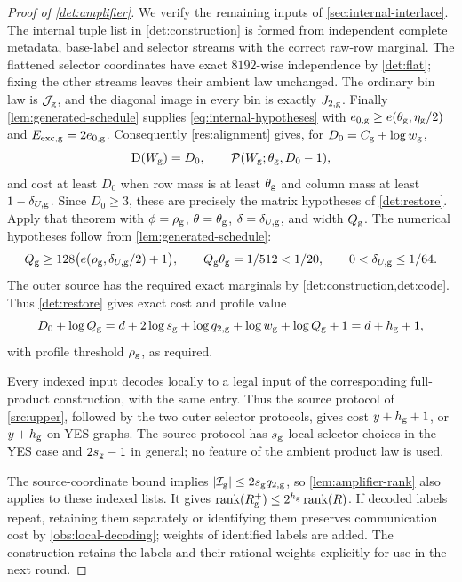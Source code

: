 \documentclass[11pt]{article} \usepackage[utf8]{inputenc}
\theoremstyle{plain} \newtheorem{theorem}{Theorem}[section]
\theoremstyle{definition} \newaliascnt{definition}{theorem}
\newcommand{\D}{\operatorname{D}}
\newcommand{\RP}[3]{\mathcal{P}(#1;#2,#3)}
\DeclareMathOperator{\rank}{rank} \crefname{claim}{Claim}{Claims}
\begin{document}
\begin{proof}[Proof of \cref{det:amplifier}]
We verify the remaining inputs of \cref{sec:internal-interlace}.
The internal tuple list in \cref{det:construction} is formed from independent
complete metadata, base-label and selector streams with the correct raw-row
marginal. The flattened selector coordinates have exact $8192$-wise
independence by \cref{det:flat}; fixing the other streams leaves their
ambient law unchanged. The ordinary bin law is $\mathcal J_{\rm g}$, and
the diagonal image in every bin is exactly $J_{2,\rm g}$. Finally
\cref{lem:generated-schedule} supplies \eqref{eq:internal-hypotheses} with
$e_{0,\rm g}\ge e(\theta_{\rm g},\eta_{\rm g}/2)$ and
$E_{\rm exc,g}=2e_{0,\rm g}$.
Consequently \cref{res:alignment} gives, for
$D_0=C_{\rm g}+\log w_{\rm g}$,
\[
 \D(W_{\rm g})=D_0,\qquad \RP{W_{\rm g}}{\theta_{\rm g}}{D_0-1},
\]
and cost at least $D_0$ when row mass is at least $\theta_{\rm g}$ and
column mass at least $1-\delta_{U,\rm g}$. Since $D_0\ge3$, these are
precisely the matrix hypotheses of \cref{det:restore}.
Apply that theorem with \(\phi=\rho_{\rm g}\), \(\theta=\theta_{\rm g}\),
\(\delta=\delta_{U,\rm g}\), and width \(Q_{\rm g}\). The numerical hypotheses
follow from \cref{lem:generated-schedule}:
\[
Q_{\rm g}\ge128\bigl(e(\rho_{\rm g},\delta_{U,\rm g}/2)+1\bigr),\qquad Q_{\rm
g}\theta_{\rm g}=1/512<1/20,\qquad 0<\delta_{U,\rm g}\le1/64.
\]
The outer source has the required exact marginals by
\cref{det:construction,det:code}. Thus \cref{det:restore} gives exact cost and
profile value
\[
D_0+\log Q_{\rm g} =d+2\log s_{\rm g}+\log q_{2,\rm g}+\log w_{\rm g}+\log
Q_{\rm g}+1 =d+h_{\rm g}+1,
\]
with profile threshold \(\rho_{\rm g}\), as required.

Every indexed input decodes locally to a legal input of the corresponding
full-product construction, with the same entry. Thus the source protocol of
\cref{src:upper}, followed by the two outer selector protocols, gives cost
$y+h_{\rm g}+1$, or $y+h_{\rm g}$ on YES graphs. The source protocol has
$s_{\rm g}$ local selector choices in the YES case and $2s_{\rm g}-1$
in general; no feature of the ambient product law is used.

The source-coordinate bound implies $|\mathcal I_{\rm g}|\le2s_{\rm g}q_{2,\rm g}$, so \cref{lem:amplifier-rank} also applies to these indexed lists.
It gives $\rank(R_{\rm g}^+)\le2^{h_{\rm g}}\rank(R)$.
If decoded labels repeat, retaining them separately or identifying them
preserves communication cost by \cref{obs:local-decoding}; weights of
identified labels are added. The construction retains the labels and their
rational weights explicitly for use in the next round.
\end{proof}
\end{document}
